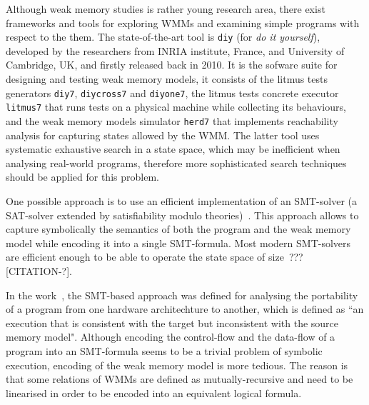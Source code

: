 Although weak memory studies is rather young research area, there exist frameworks and tools for exploring WMMs and examining simple programs with respect to the them. The state-of-the-art tool is \texttt{diy} (for \textit{do it yourself}), developed by the researchers from INRIA institute, France, and University of Cambridge, UK, and firstly released back in 2010. It is the sofware suite for designing and testing weak memory models, it consists of the litmus tests generators \texttt{diy7}, \texttt{diycross7} and \texttt{diyone7}, the litmus tests concrete executor \texttt{litmus7} that runs tests on a physical machine while collecting its behaviours, and the weak memory models simulator \texttt{herd7} that implements reachability analysis for capturing states allowed by the WMM. The latter tool uses systematic exhaustive search in a state space, which may be inefficient when analysing real-world programs, therefore more sophisticated search techniques should be applied for this problem. 

One possible approach is to use an efficient implementation of an SMT-solver (a SAT-solver extended by satisfiability modulo theories)~\cite{Porthos17}. %
This approach allows to capture symbolically the semantics of both the program and the weak memory model while encoding it into a single SMT-formula.
Most modern SMT-solvers are efficient enough to be able to operate the state space of size~??? [CITATION-?].

In the work~\cite{Porthos17}, the SMT-based approach was defined for analysing the portability of a program from one hardware architechture to another, which is defined as ``an execution that is consistent with the target but inconsistent with the source memory model". Although encoding the control-flow and the data-flow of a program into an SMT-formula seems to be a trivial problem of symbolic execution, encoding of the weak memory model is more tedious. The reason is that some relations of WMMs are defined as mutually-recursive and need to be linearised in order to be encoded into an equivalent logical formula.

